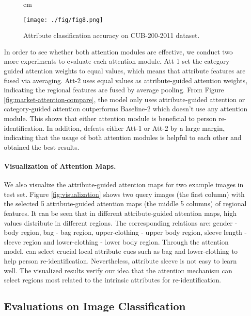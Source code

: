 \documentclass[sigconf]{acmart}
\begin{document}
\begin{figure*}[!htp]
 cm
\begin{center}
   \texttt{[image: ./fig/fig8.png]}
\end{center}
   \caption{Attribute classification accuracy on CUB-200-2011 dataset. }
\label{fig:cub-attr}
\end{figure*}

In order to see whether both attention modules are effective, we conduct two more experiments to evaluate each attention module. Att-1 set the category-guided attention weights to equal values, which means that attribute features are fused via averaging. Att-2 uses equal values as attribute-guided attention weights, indicating the regional features are fused by average pooling. From Figure \ref {fig:market-attention-compare}, the model only uses attribute-guided attention or category-guided attention outperforms Baseline-2 which doesn't use any attention module. This shows that either attention module is beneficial to person re-identification. In addition,  defeats either Att-1 or Att-2 by a large margin, indicating that the usage of both attention modules is helpful to each other and obtained the best results.

\paragraph{Visualization of Attention Maps.}
We also visualize the attribute-guided attention maps for two example images in test set. Figure \ref{fig:visualization} shows two query images (the first column) with the selected 5 attribute-guided attention maps (the middle 5 columns) of regional features. It can be seen that in different attribute-guided attention maps, high values distribute in different regions. The corresponding relations are: gender - body region, bag - bag region, upper-clothing - upper body region, sleeve length - sleeve region and lower-clothing - lower body region. Through the attention model,  can select crucial local attribute cues such as bag and lower-clothing to help person re-identification. Nevertheless, attribute sleeve is not easy to learn well. The visualized results verify our idea that the attention mechanism can select regions most related to the intrinsic attributes for re-identification.

\subsection{Evaluations on Image Classification}
\end{document}

